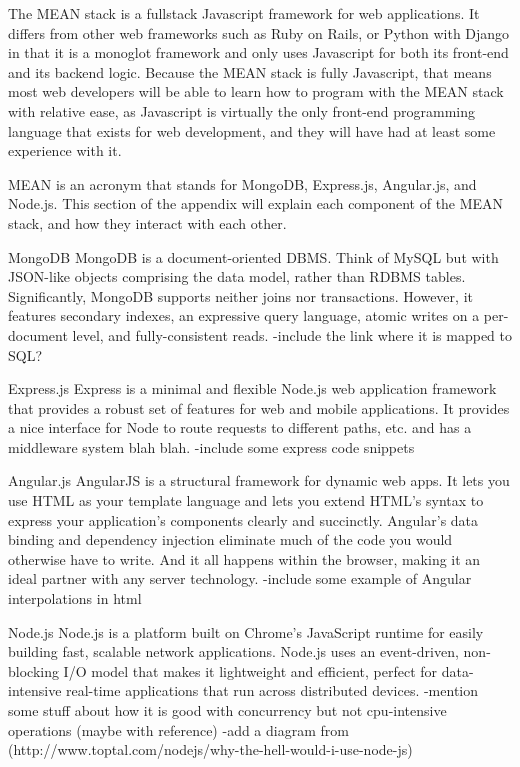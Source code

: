 \documentclass[12pt]{article}
\begin{document}

The MEAN stack is a fullstack Javascript framework for web applications. It differs from other web frameworks such as Ruby on Rails, or Python with Django in that it is a monoglot framework and only uses Javascript for both its front-end and its backend logic. Because the MEAN stack is fully Javascript, that means most web developers will be able to learn how to program with the MEAN stack with relative ease, as Javascript is virtually the only front-end programming language that exists for web development, and they will have had at least some experience with it.

MEAN is an acronym that stands for MongoDB, Express.js, Angular.js, and Node.js. This section of the appendix will explain each component of the MEAN stack, and how they interact with each other.

MongoDB %
MongoDB is a document-oriented DBMS. Think of MySQL but with JSON-like objects comprising the data model, rather than RDBMS tables. Significantly, MongoDB supports neither joins nor transactions. However, it features secondary indexes, an expressive query language, atomic writes on a per-document level, and fully-consistent reads.
-include the link where it is mapped to SQL?

Express.js %
Express is a minimal and flexible Node.js web application framework that provides a robust set of features for web and mobile applications.
It provides a nice interface for Node to route requests to different paths, etc. and has a middleware system blah blah.
-include some express code snippets

Angular.js %
AngularJS is a structural framework for dynamic web apps. It lets you use HTML as your template language and lets you extend HTML's syntax to express your application's components clearly and succinctly. Angular's data binding and dependency injection eliminate much of the code you would otherwise have to write. And it all happens within the browser, making it an ideal partner with any server technology.
-include some example of Angular interpolations in html

Node.js %
Node.js is a platform built on Chrome's JavaScript runtime for easily building fast, scalable network applications. Node.js uses an event-driven, non-blocking I/O model that makes it lightweight and efficient, perfect for data-intensive real-time applications that run across distributed devices.
-mention some stuff about how it is good with concurrency but not cpu-intensive operations (maybe with reference)
-add a diagram from (http://www.toptal.com/nodejs/why-the-hell-would-i-use-node-js)
\end{document}
